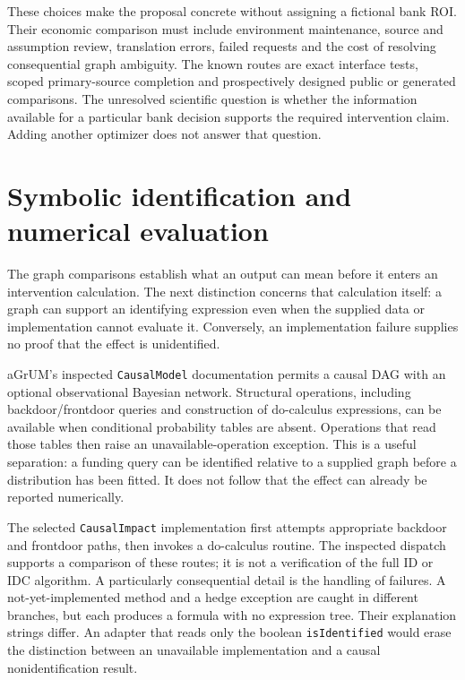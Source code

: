 These choices make the proposal concrete without assigning a fictional bank
ROI. Their economic comparison must include environment maintenance, source
and assumption review, translation errors, failed requests and the cost of
resolving consequential graph ambiguity. The known routes are exact interface
tests, scoped primary-source completion and prospectively designed public or
generated comparisons. The unresolved scientific question is whether the
information available for a particular bank decision supports the required
intervention claim. Adding another optimizer does not answer that question.
\label{exec13:python-discovery-end}




\section{Symbolic identification and numerical evaluation}

The graph comparisons establish what an output can mean before it enters an
intervention calculation. The next distinction concerns that calculation
itself: a graph can support an identifying expression even when the supplied
data or implementation cannot evaluate it. Conversely, an implementation
failure supplies no proof that the effect is unidentified.

aGrUM's inspected \texttt{CausalModel} documentation permits a causal DAG with
an optional observational Bayesian network. Structural operations, including
backdoor/frontdoor queries and construction of do-calculus expressions, can
be available when conditional probability tables are absent. Operations that
read those tables then raise an unavailable-operation exception. This is a
useful separation: a funding query can be identified relative to a supplied
graph before a distribution has been fitted. It does not follow that the
effect can already be reported numerically. \cite{v12_sw_agrum}

The selected \texttt{CausalImpact} implementation first attempts appropriate
backdoor and frontdoor paths, then invokes a do-calculus routine. The inspected
dispatch supports a comparison of these routes; it is not a verification of
the full ID or IDC algorithm. A particularly consequential detail is the
handling of failures. A not-yet-implemented method and a hedge exception are
caught in different branches, but each produces a formula with no expression
tree. Their explanation strings differ. An adapter that reads only the boolean
\texttt{isIdentified} would erase the distinction between an unavailable
implementation and a causal nonidentification result. \cite{v12_sw_agrum}

